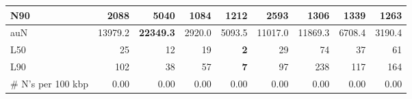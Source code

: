 \documentclass[12pt,a4paper]{article}
\begin{document}
\begin{table}[ht]
\begin{center}
\begin{tabular}{|l*{8}{|r}|}
N90 & 2088 & {\bf 5040} & 1084 & 1212 & 2593 & 1306 & 1339 & 1263 \\ \hline
auN & 13979.2 & {\bf 22349.3} & 2920.0 & 5093.5 & 11017.0 & 11869.3 & 6708.4 & 3190.4 \\ \hline
L50 & 25 & 12 & 19 & {\bf 2} & 29 & 74 & 37 & 61 \\ \hline
L90 & 102 & 38 & 57 & {\bf 7} & 97 & 238 & 117 & 164 \\ \hline
\# N's per 100 kbp & 0.00 & 0.00 & 0.00 & 0.00 & 0.00 & 0.00 & 0.00 & 0.00 \\ \hline
\end{tabular}
\end{center}
\end{table}
\end{document}
